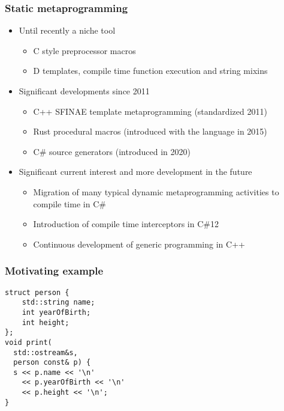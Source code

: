 \begin{frame}
	\frametitle{Static metaprogramming}

	\begin{itemize}
		\item Until recently a niche tool \begin{itemize}
			      \item C style preprocessor macros
			      \item D templates, compile time function execution and string mixins
		      \end{itemize}
		\item Significant developments since 2011\begin{itemize}
			      \item C++ SFINAE template metaprogramming (standardized 2011)
			      \item Rust procedural macros (introduced with the language in 2015)
			      \item C\# source generators (introduced in 2020)
		      \end{itemize}

		\item Significant current interest and more development in the future\begin{itemize}
			      \item Migration of many typical dynamic metaprogramming activities to compile time in C\#
			      \item Introduction of compile time interceptors in C\#12
			      \item Continuous development of generic programming in C++
		      \end{itemize}
	\end{itemize}

\end{frame}

\begin{frame}[fragile]
	\frametitle{Motivating example}
	\begin{lstlisting}
struct person {
	std::string name;
	int yearOfBirth;
	int height;
};
void print(
  std::ostream&s,
  person const& p) {
  s << p.name << '\n'
    << p.yearOfBirth << '\n'
    << p.height << '\n';
}
	\end{lstlisting}

\end{frame}

